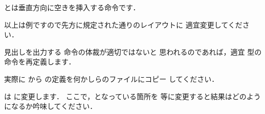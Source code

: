 %
%
%
%
\begin{InTeX}
\renewcommand{\maketitle}{%
\begin{titlepage}
    \let\footnotesize\small
    \let\footnoterule\relax
    \let\footnote\thanks
    \null\vskip2\cvs%
    \begin{center}\thispagestyle{empty}%
      {\LARGE\headfont ここに表題を書きます}\par\vskip\cvs
      {\Large\normalfont 未来太郎}\par\vskip2\cvs
      {\small 未来研究学科 \qquad 学籍番号}\par\vskip.5\cvs
      {\small 指導教員 \qquad 北海太郎}\par\vskip2\cvs
      {提出日 2006/03/30}\par\vskip3\cvs
      {\Large\headfont English Title}\par\vskip\cvs
      {\large\rmfamily Your Name}\par\vskip\cvs
    \end{center}%
    \vfill\null
\end{titlepage}}
\end{InTeX}

とは垂直方向に空きを挿入する命令です．

以上は例ですので先方に規定された通りのレイアウトに
適宜変更してください．



見出しを出力する  命令の体裁が適切ではないと
思われるのであれば，適宜 型の命令を再定義します．


\begin{Exe}
実際に から の定義を何かしらのファイルにコピー
してください．

\begin{InTeX}
\makeatletter
\renewcommand{\section}{%
    \if@slide\clearpage\fi
    \@startsection{section}{1}{\z@}%
    {\Cvs \@plus.5\Cdp \@minus.2\Cdp}%
    {.5\Cvs \@plus.3\Cdp}%
    {\normalfont\Large\headfont\raggedright}}
\makeatother 
\end{InTeX}

 は  に変更します．
ここで，となっている箇所を 
等に変更すると結果はどのようになるか吟味してください．
\end{Exe}

